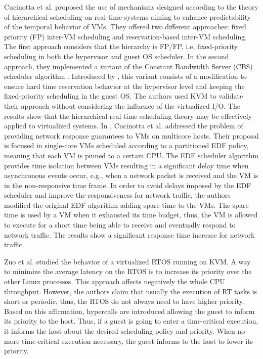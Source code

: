 Cucinotta et al. \cite{cucinotta2009} proposed the use of mechanisms designed according to the theory of hierarchical scheduling on real-time systems aiming to enhance predictability of the temporal behavior of VMs. They offered two different approaches: fixed priority (FP) inter-VM scheduling and reservation-based inter-VM scheduling. The first approach considers that the hierarchy is FP/FP, i.e, fixed-priority scheduling in both the hypervisor and guest OS scheduler.  In the second approach, they implemented a variant of the Constant Bandwidth Server (CBS) scheduler algorithm \cite{abeni1998}. Introduced by \cite{Palopoli2009}, this variant consists of a modification to ensure hard time reservation behavior at the hypervisor level and keeping the fixed-priority scheduling in the guest OS. The authors used KVM to validate their approach without considering the influence of the virtualized I/O. The results show that the hierarchical real-time scheduling theory may be effectively applied to virtualized systems. In \cite{cucinotta2011}, Cucinotta et al. addressed the problem of providing network response guarantees to VMs on multicore hosts. Their proposal is focused in single-core VMs scheduled according to a partitioned EDF policy, meaning that each VM is pinned to a certain CPU. The EDF scheduler algorithm provides  time isolation between VMs resulting in a significant delay time when asynchronous events occur, e.g., when a network packet is received and the VM is in the non-responsive time frame. In order to avoid delays imposed by the EDF scheduler and improve the responsiveness for network traffic, the authors modified the original EDF algorithm adding spare time to the VMs. The spare time is used by a VM when it exhausted its time budget, thus, the VM is allowed to execute for a short time being able to receive and eventually respond to network traffic. The results show a significant response time increase for network traffic. 

Zuo et al. \cite{zuo2010} studied the behavior of a virtualized RTOS running on KVM. A way to minimize the average latency on the RTOS is to increase its priority over the other Linux processes. This approach affects negatively the whole CPU throughput. However, the authors claim that usually the execution of RT tasks is short or periodic, thus, the RTOS do not always need to have higher priority. Based on this affirmation, hypercalls are introduced allowing the guest to inform its priority to the host. Thus, if a guest is going to enter a time-critical execution, it informs the host about the desired scheduling policy and priority. When no more time-critical execution necessary, the guest informs to the host to lower its priority. 

